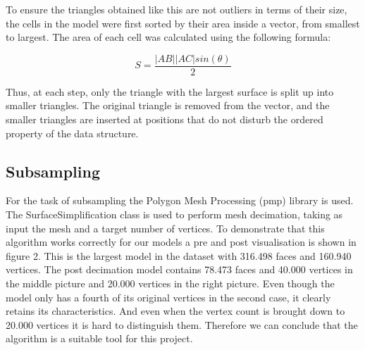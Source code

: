 \documentclass{bigdata}
\begin{document}
To ensure the triangles obtained like this are not outliers in terms of their size, the cells in the model were first sorted by their area inside a vector, from smallest to largest. The area of each cell was calculated using the following formula:

\begin{equation}
S = \frac{|AB||AC|sin(\theta)}{2}
\end{equation}

Thus, at each step, only the triangle with the largest surface is split up into smaller triangles. The original triangle is removed from the vector, and the smaller triangles are inserted at positions that do not disturb the ordered property of the data structure.

\subsection{Subsampling}
For the task of subsampling the Polygon Mesh Processing (pmp) library is used. The SurfaceSimplification class is used to perform mesh decimation, taking as input the mesh and a target number of vertices. To demonstrate that this algorithm works correctly for our models a pre and post visualisation is shown in figure 2. This is the largest model in the dataset with 316.498 faces and 160.940 vertices. The post decimation model contains 78.473 faces and 40.000 vertices in the middle picture and 20.000 vertices in the right picture. Even though the model only has a fourth of its original vertices in the second case, it clearly retains its characteristics. And even when the vertex count is brought down to 20.000 vertices it is hard to distinguish them. Therefore we can conclude that the algorithm is a suitable tool for this project.
\end{document}
